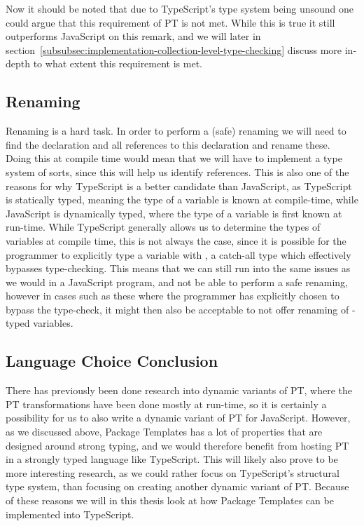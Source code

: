 Now it should be noted that due to TypeScript's type system being unsound one could argue that this requirement of PT is not met.
While this is true it still outperforms JavaScript on this remark, and we will later in section~\vref{subsubsec:implementation-collection-level-type-checking} discuss more in-depth to what extent this requirement is met.

\subsection{Renaming}\label{subsec:ts-vs-js-renaming}

Renaming is a hard task.
In order to perform a (safe) renaming we will need to find the declaration and all references to this declaration and rename these.
Doing this at compile time would mean that we will have to implement a type system of sorts, since this will help us identify references.
This is also one of the reasons for why TypeScript is a better candidate than JavaScript, as TypeScript is statically typed, meaning the type of a variable is known at compile-time, while JavaScript is dynamically typed, where the type of a variable is first known at run-time.
While TypeScript generally allows us to determine the types of variables at compile time, this is not always the case, since it is possible for the programmer to explicitly type a variable with , a catch-all type which effectively bypasses type-checking.
This means that we can still run into the same issues as we would in a JavaScript program, and not be able to perform a safe renaming, however in cases such as these where the programmer has explicitly chosen to bypass the type-check, it might then also be acceptable to not offer renaming of -typed variables.

\subsection{Language Choice Conclusion}\label{subsec:langauge-choice-conclusion}


There has previously been done research into dynamic variants of PT, where the PT transformations have been done mostly at run-time, so it is certainly a possibility for us to also write a dynamic variant of PT for JavaScript.
However, as we discussed above, Package Templates has a lot of properties that are designed around strong typing, and we would therefore benefit from hosting PT in a strongly typed language like TypeScript.
This will likely also prove to be more interesting research, as we could rather focus on TypeScript's structural type system, than focusing on creating another dynamic variant of PT\@.
Because of these reasons we will in this thesis look at how Package Templates can be implemented into TypeScript.

